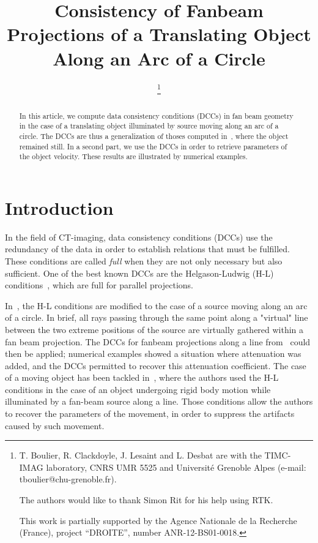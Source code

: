 \documentclass[twocolumn]{IEEEtran}
\title{Consistency of Fanbeam Projections of a Translating Object Along an Arc of a Circle}
\date{}
\numberwithin{equation}{section}
\begin{document}
\author{
	\thanks{T. Boulier, R. Clackdoyle, J. Lesaint and L. Desbat are with the TIMC-IMAG laboratory, CNRS UMR 5525 and Universit\'e Grenoble Alpes (e-mail: tboulier@chu-grenoble.fr).

	The authors would like to thank Simon Rit for his help using RTK.
			
	This work is partially supported by the Agence Nationale de la Recherche (France), project ``DROITE'', number ANR-12-BS01-0018.
}		
\IEEEauthorblockA{}
}

\maketitle

\begin{abstract}
In this article, we compute data consistency conditions
(DCCs) in fan beam geometry in the case of a translating object illuminated by source moving along an arc of a circle. The DCCs are thus a generalization of thoses computed in~\cite{clackdoyle2015consistency}, where the object remained still. In a second part, we use the DCCs in order to retrieve parameters of the object velocity. These results are illustrated by numerical examples.
\end{abstract}

\section{Introduction}

In the field of CT-imaging, data consistency conditions (DCCs) use the redundancy of the data in order to establish relations that must be fulfilled. These conditions are called \emph{full} when they are not only necessary but also sufficient. One of the best known DCCs are the Helgason-Ludwig (H-L) conditions~\cite{helgason1980radon,ludwig1966radon}, which are full for parallel projections.

In~\cite{clackdoyle2015consistency}, the H-L conditions are modified to the case of a source moving along an arc of a circle. In brief, all rays passing through the same point along a "virtual" line between the two extreme positions of the source are virtually gathered within a fan beam projection. The DCCs for fanbeam projections along a line from~\cite{clackdoyle2013necessary} could then be applied; numerical examples showed a situation where attenuation was added, and the DCCs permitted to recover this attenuation coefficient. The case of a moving object has been tackled in~\cite{yu2006data,yu2007data}, where the authors used the H-L conditions in the case of an object undergoing rigid body motion while illuminated by a fan-beam source along a line. Those conditions allow the authors to recover the parameters of the movement, in order to suppress the artifacts caused by such movement.
\end{document}
